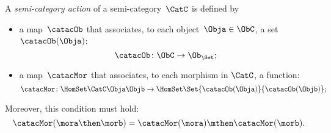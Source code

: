 \begin{ctdefinition}
    \label{def:semicategory-action}
    A \emph{semi-category action} of a semi-category~$\CatC$ is defined by
    \begin{itemize}
        \item a map~$\catacOb$ that associates, to each object~$\Obja \in \ObC$, a set~$\catacOb(\Obja)$:
        \begin{equation}
            \catacOb \colon \ObC \to \Ob_\Set;
        \end{equation}
        \item a map~$\catacMor$ that associates, to each morphism in $\CatC$, a function:
        \begin{equation}
            \catacMor\colon \HomSet\CatC\Obja\Objb \to  \HomSet\Set{\catacOb(\Obja)}{\catacOb(\Objb) };
        \end{equation}
    \end{itemize}
    Moreover, this condition must hold:
    \begin{equation}
        \catacMor(\mora\then\morb) = \catacMor(\mora) \mthen \catacMor(\morb).
    \end{equation}
\end{ctdefinition}

